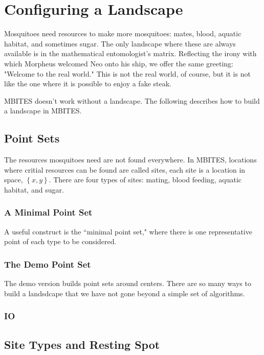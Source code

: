 \documentclass{article}
\begin{document}
\section{Configuring a Landscape} 

Mosquitoes need resources to make more mosquitoes: mates, blood, aquatic habitat, and sometimes sugar. The only landscape where these are always available is in the mathematical entomologist's matrix. Reflecting the irony with which Morpheus welcomed Neo onto his ship, we offer the same greeting: "Welcome to the real world." This is not the real world, of course, but it is not like the one where it is possible to enjoy a fake steak. 

MBITES doesn't work without a landscape. The following describes how to build a landscape in MBITES. 

\subsection{Point Sets}

The resources mosquitoes need are not found everywhere.  In MBITES, locations where critial resources can be found are called sites, each site is a location in space, $\left\{ x,y \right\}$. There are four types of sites: mating, blood feeding, aquatic habitat, and sugar.

\subsubsection{A Minimal Point Set}

A useful construct is the ``minimal point set," where there is one representative point of each type to be considered. 

\subsubsection{The Demo Point Set}

The demo version builds point sets around centers. There are so many ways to build a landsdcape that we have not gone beyond a simple set of algorithms. 

\subsubsection{IO}

\subsection{Site Types and Resting Spot}
\end{document}
